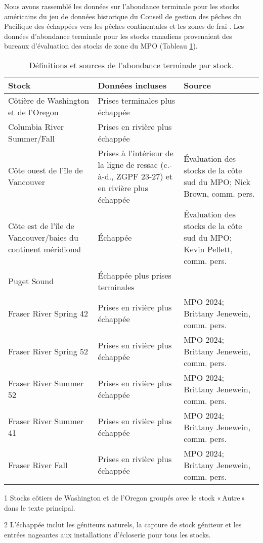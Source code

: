 \label{app:terminal-abundance}

Nous avons rassemblé les données sur l'abondance terminale pour les stocks américains du jeu de données historique du Conseil de gestion des pêches du Pacifique des échappées vers les pêches continentales et les zones de frai \citep{pfmcEscapementsInlandFisheries2024}. Les données d'abondance terminale pour les stocks canadiens provenaient des bureaux d'évaluation des stocks de zone du MPO (Tableau \ref{tab:sources}).  

\begin{table}[h!]
\centering
\begin{threeparttable}
\caption{Définitions et sources de l'abondance terminale par stock.}
\label{tab:sources}
\begin{tabular}{p{5cm}p{4.5cm}p{4.5cm}}
\toprule
\textbf{Stock} & \textbf{Données incluses} & \textbf{Source} \\
\midrule
Côtière de Washington et de l'Oregon\tnote{1} & Prises terminales plus échappée\tnote{2} & \cite{pfmcEscapementsInlandFisheries2024} \\
Columbia River Summer/Fall & Prises en rivière plus échappée & \cite{pfmcEscapementsInlandFisheries2024} \\
Côte ouest de l'île de Vancouver & Prises à l'intérieur de la ligne de ressac (c.-à-d., ZGPF 23-27) et en rivière plus échappée & Évaluation des stocks de la côte sud du MPO; Nick Brown, comm. pers. \\
Côte est de l'île de Vancouver/baies du continent méridional & Échappée & Évaluation des stocks de la côte sud du MPO; Kevin Pellett, comm. pers. \\
Puget Sound & Échappée plus prises terminales & \cite{pfmcEscapementsInlandFisheries2024} \\
Fraser River Spring 42 & Prises en rivière plus échappée & MPO 2024; Brittany Jenewein, comm. pers. \\
Fraser River Spring 52 & Prises en rivière plus échappée & MPO 2024; Brittany Jenewein, comm. pers. \\
Fraser River Summer 52 & Prises en rivière plus échappée & MPO 2024; Brittany Jenewein, comm. pers. \\
Fraser River Summer 41 & Prises en rivière plus échappée & MPO 2024; Brittany Jenewein, comm. pers. \\
Fraser River Fall & Prises en rivière plus échappée & MPO 2024; Brittany Jenewein, comm. pers. \\
\bottomrule
\end{tabular}

\begin{tablenotes}
\item[1] Stocks côtiers de Washington et de l'Oregon groupés avec le stock «\,Autre\,» dans le texte principal.
\item[2] L'échappée inclut les géniteurs naturels, la capture de stock géniteur et les entrées nageantes aux installations d'écloserie pour tous les stocks.
\end{tablenotes}

\end{threeparttable}
\end{table}

